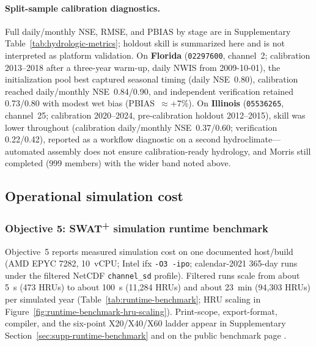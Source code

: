 \begin{table}[htbp]
  \centering
  \caption{Top eight Morris $\mu^*$ for basin \texttt{05536265} (full 36-parameter ranking in archived \texttt{tab-sensitivity-morris.csv}).}
  \label{tab:morris-sensitivity-05536265}
  \footnotesize
  \setlength{\tabcolsep}{4pt}
  \renewcommand{\arraystretch}{1.05}
\end{table}

\paragraph{Split-sample calibration diagnostics.}
Full daily/monthly NSE, RMSE, and PBIAS by stage are in Supplementary Table~\ref{tab:hydrologic-metrics}; holdout skill is summarized here and is not interpreted as platform validation.
On \textbf{Florida} (\texttt{02297600}, channel~2; calibration 2013--2018 after a three-year warm-up, daily NWIS from 2009-10-01), the initialization pool best captured seasonal timing (daily NSE~0.80), calibration reached daily/monthly NSE~0.84/0.90, and independent verification retained 0.73/0.80 with modest wet bias (PBIAS~$\approx+7\%$).
On \textbf{Illinois} (\texttt{05536265}, channel~25; calibration 2020--2024, pre-calibration holdout 2012--2015), skill was lower throughout (calibration daily/monthly NSE~0.37/0.60; verification 0.22/0.42), reported as a workflow diagnostic on a second hydroclimate---automated assembly does not ensure calibration-ready hydrology, and Morris still completed (999 members) with the wider band noted above.
\label{sec:results-cal-val-05536265}

\subsection{Operational simulation cost}
\label{sec:results-runtime-benchmark}

\subsubsection{Objective 5: SWAT\textsuperscript{+} simulation runtime benchmark}
\label{sec:results-obj5}

Objective~5 reports measured simulation cost on one documented host/build (AMD EPYC 7282, 10~vCPU; Intel ifx \texttt{-O3 -ipo}; calendar-2021 365-day runs under the filtered NetCDF \texttt{channel\_sd} profile). Filtered runs scale from about 5~s (473 HRUs) to about 100~s (11{,}284 HRUs) and about 23~min (94{,}303 HRUs) per simulated year (Table~\ref{tab:runtime-benchmark}; HRU scaling in Figure~\ref{fig:runtime-benchmark-hru-scaling}). Print-scope, export-format, compiler, and the six-point X20/X40/X60 ladder appear in Supplementary Section~\ref{sec:supp-runtime-benchmark} and on the public benchmark page \citep{SWATGenXcompanion}.

